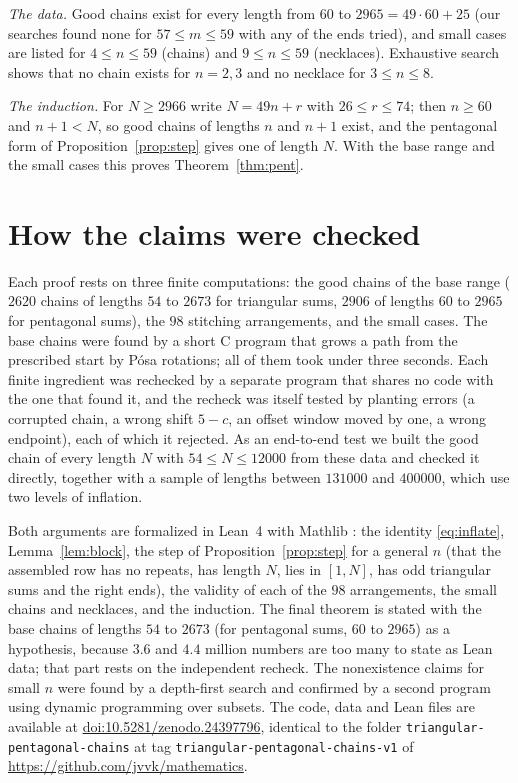 \documentclass[11pt]{article}
\theoremstyle{definition}
\theoremstyle{remark}
\begin{document}
\emph{The data.} Good chains exist for every length from $60$ to $2965=49\cdot60+25$ (our searches found
none for $57\le m\le59$ with any of the ends tried), and small cases are listed for $4\le n\le59$ (chains) and
$9\le n\le59$ (necklaces). Exhaustive search shows that no chain exists for $n=2,3$ and no necklace for
$3\le n\le8$.

\emph{The induction.} For $N\ge2966$ write $N=49n+r$ with $26\le r\le74$; then $n\ge60$ and $n+1<N$, so good
chains of lengths $n$ and $n+1$ exist, and the pentagonal form of Proposition~\ref{prop:step} gives one of length
$N$. With the base range and the small cases this proves Theorem~\ref{thm:pent}.

\section{How the claims were checked}\label{sec:checks}

Each proof rests on three finite computations: the good chains of the base range ($2620$ chains of
lengths $54$ to $2673$ for triangular sums, $2906$ of lengths $60$ to $2965$ for pentagonal sums), the
$98$ stitching arrangements, and the small cases. The base chains were found by a short C
program that grows a path from the prescribed start by P\'osa rotations; all of them took under three seconds. Each
finite ingredient was rechecked by a separate program that shares no code with the one that found
it, and the recheck was itself tested by planting errors (a corrupted chain, a wrong shift $5-c$,
an offset window moved by one, a wrong endpoint), each of which it rejected. As an end-to-end test
we built the good chain of every length $N$ with $54\le N\le12000$ from these data and checked it directly,
together with a sample of lengths between $131000$ and $400000$, which use two levels of
inflation.

Both arguments are formalized in Lean~4 with Mathlib \cite{mathlib}: the identity
\eqref{eq:inflate}, Lemma~\ref{lem:block}, the step of Proposition~\ref{prop:step} for a general
$n$ (that the assembled row has no repeats, has length $N$, lies in $[1,N]$, has odd triangular
sums and the right ends), the validity of each of the $98$ arrangements, the small chains and
necklaces, and the induction. The final theorem is stated with the base chains of lengths $54$ to
$2673$ (for pentagonal sums, $60$ to $2965$) as a hypothesis, because $3.6$ and $4.4$ million numbers are too many to state as Lean data; that
part rests on the independent recheck. The nonexistence claims for small $n$ were found by a depth-first
search and confirmed by a second program using dynamic programming over subsets. The code, data and Lean
files are available at \href{https://doi.org/10.5281/zenodo.24397796}{doi:10.5281/zenodo.24397796}, identical to the folder
\texttt{triangular-pentagonal-chains} at tag \texttt{triangular-pentagonal-chains-v1} of \url{https://github.com/jvvk/mathematics}.
\end{document}
